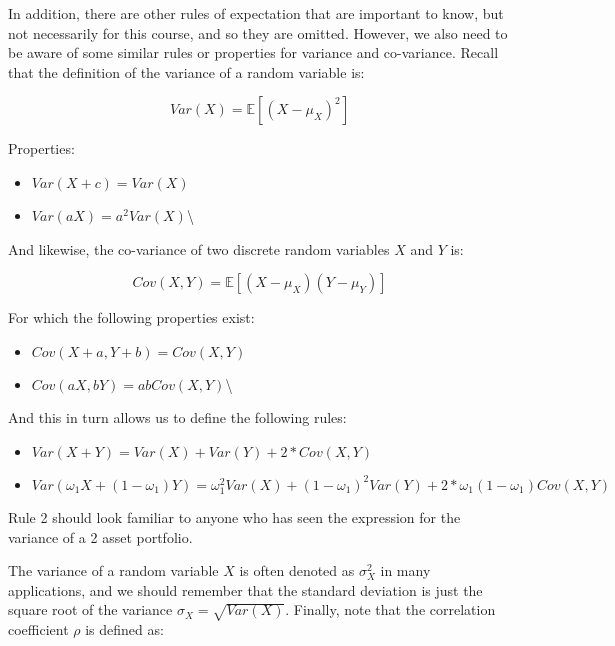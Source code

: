 \documentclass[]{book}
\providecommand{\tightlist}{%
  \setlength{\itemsep}{0pt}\setlength{\parskip}{0pt}}
\theoremstyle{definition}
\theoremstyle{definition}
\theoremstyle{definition}
\theoremstyle{remark}
\begin{document}
In addition, there are other rules of expectation that are important to
know, but not necessarily for this course, and so they are omitted.
However, we also need to be aware of some similar rules or properties
for variance and co-variance. Recall that the definition of the variance
of a random variable is:

\begin{equation}
Var(X) = \mathbb{E}[(X - \mu_X)^2]
\end{equation}

Properties:

\begin{itemize}
\tightlist
\item
  \(Var(X + c) = Var(X)\)
\item
  \(Var(aX) = a^2 Var(X)\)\textbackslash{}
\end{itemize}

And likewise, the co-variance of two discrete random variables \(X\) and
\(Y\) is:

\begin{equation}
Cov(X,Y) = \mathbb{E}[(X-\mu_X)(Y-\mu_Y)]
\end{equation}

For which the following properties exist:

\begin{itemize}
\tightlist
\item
  \(Cov(X+a,Y+b) = Cov(X,Y)\)
\item
  \(Cov(aX,bY) = abCov(X,Y)\)\textbackslash{}
\end{itemize}

And this in turn allows us to define the following rules:

\begin{itemize}
\tightlist
\item
  \(Var(X + Y) = Var(X) + Var(Y) + 2*Cov(X,Y)\)
\item
  \(Var(\omega_1 X + (1-\omega_1)Y) = \omega_1^2 Var(X) + (1 - \omega_1)^2 Var(Y) + 2* \omega_1 (1 - \omega_1) Cov(X,Y)\)
\end{itemize}

Rule 2 should look familiar to anyone who has seen the expression for
the variance of a 2 asset portfolio.

The variance of a random variable \(X\) is often denoted as
\(\sigma_X^2\) in many applications, and we should remember that the
standard deviation is just the square root of the variance
\(\sigma_X = \sqrt{Var(X)}\). Finally, note that the correlation
coefficient \(\rho\) is defined as:
\end{document}
